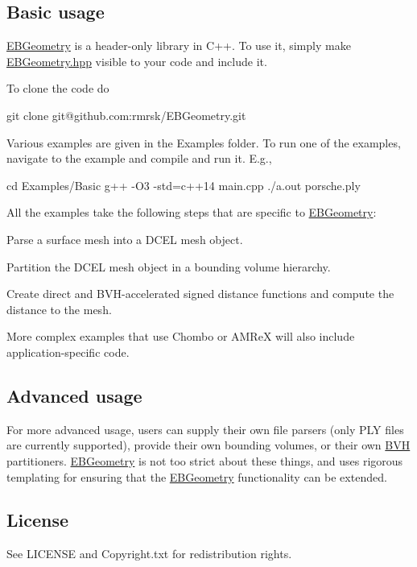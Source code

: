 \subsection*{Basic usage }

\hyperlink{namespaceEBGeometry}{E\+B\+Geometry} is a header-\/only library in C++. To use it, simply make \hyperlink{EBGeometry_8hpp_source}{E\+B\+Geometry.\+hpp} visible to your code and include it.

To clone the code do \begin{DoxyVerb}git clone git@github.com:rmrsk/EBGeometry.git
\end{DoxyVerb}


Various examples are given in the Examples folder. To run one of the examples, navigate to the example and compile and run it. E.\+g., \begin{DoxyVerb}cd Examples/Basic
g++ -O3 -std=c++14 main.cpp
./a.out porsche.ply
\end{DoxyVerb}


All the examples take the following steps that are specific to \hyperlink{namespaceEBGeometry}{E\+B\+Geometry}\+:


\begin{DoxyEnumerate}
\item Parse a surface mesh into a D\+C\+EL mesh object.
\item Partition the D\+C\+EL mesh object in a bounding volume hierarchy.
\item Create direct and B\+V\+H-\/accelerated signed distance functions and compute the distance to the mesh.
\end{DoxyEnumerate}

More complex examples that use Chombo or A\+M\+ReX will also include application-\/specific code.

\subsection*{Advanced usage }

For more advanced usage, users can supply their own file parsers (only P\+LY files are currently supported), provide their own bounding volumes, or their own \hyperlink{namespaceBVH}{B\+VH} partitioners. \hyperlink{namespaceEBGeometry}{E\+B\+Geometry} is not too strict about these things, and uses rigorous templating for ensuring that the \hyperlink{namespaceEBGeometry}{E\+B\+Geometry} functionality can be extended.

\subsection*{License }

See L\+I\+C\+E\+N\+SE and Copyright.\+txt for redistribution rights. 